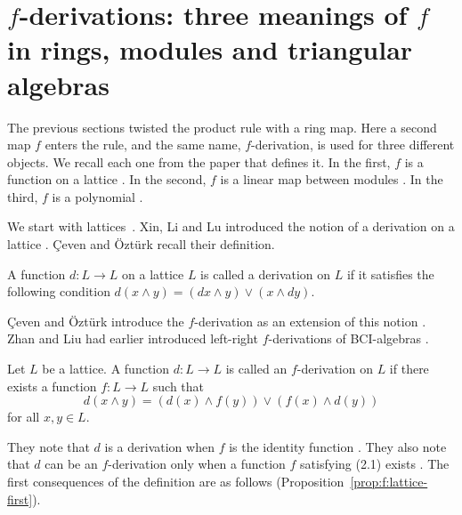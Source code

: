 \section{$f$-derivations: three meanings of $f$ in rings, modules and triangular algebras}\label{sec:generalized-twisted:f-derivations}

The previous sections twisted the product rule with a ring map. Here a second
map $f$ enters the rule, and the same name, $f$-derivation, is used for three
different objects. We recall each one from the paper that defines it.
\cite[p.~702]{CevenOzturk2008}
In the first, $f$ is a function on a lattice
\cite[Definition~8, p.~702]{CevenOzturk2008}. In the second, $f$ is a linear
map between modules \cite[p.~190]{Benkovic2014}. In the third, $f$ is a
polynomial \cite[p.~2]{Benkovic2014}.

We start with lattices~\cite[p.~701]{CevenOzturk2008}. Xin, Li and Lu introduced the notion of a derivation
on a lattice \cite[p.~701]{CevenOzturk2008}. Çeven and Öztürk recall their
definition.

\begin{definition}\label{def:f:lattice-derivation}
A function $d:L\to L$ on a lattice $L$ is called a derivation on $L$ if it satisfies
the following condition
$d(x\wedge y)=(dx\wedge y)\vee(x\wedge dy)$.
\end{definition}

Çeven and Öztürk introduce the $f$-derivation as an extension of this notion
\cite[p.~701]{CevenOzturk2008}. Zhan and Liu had earlier introduced left-right
$f$-derivations of BCI-algebras \cite[p.~701]{CevenOzturk2008}.

\begin{definition}\label{def:f:lattice}
Let $L$ be a lattice. A function $d:L\to L$ is called an $f$-derivation on $L$ if there
exists a function $f:L\to L$ such that
\[ d(x\wedge y)=(d(x)\wedge f(y))\vee(f(x)\wedge d(y)) \tag{2.1} \]
for all $x,y\in L$.
\end{definition}

They note that $d$ is a derivation when $f$ is the identity function
\cite[p.~702]{CevenOzturk2008}. They also note that $d$ can be an
$f$-derivation only when a function $f$ satisfying (2.1) exists
\cite[p.~702]{CevenOzturk2008}. The first consequences of the definition are
as follows (Proposition~\ref{prop:f:lattice-first}).

